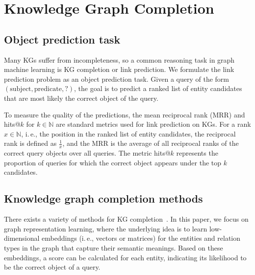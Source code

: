 \documentclass[
]{ceurart}
\begin{document}
\section{Knowledge Graph Completion}
\label{sec:knowledge}

\subsection{Object prediction task}
Many KGs suffer from incompleteness, so a common reasoning task in graph machine learning is KG completion or link prediction. We formulate the link prediction problem as an object prediction task. Given a query of the form $(\mathrm{subject}, \mathrm{predicate}, \mathrm{?})$, the goal is to predict a ranked list of entity candidates that are most likely the correct object of the query. 

To measure the quality of the predictions, the mean reciprocal rank (MRR) and hits@$k$ for $k \in \mathbb{N}$ are standard metrics used for link prediction on KGs. For a rank $x \in \mathbb{N}$, i.\,e., the position in the ranked list of entity candidates, the reciprocal rank is defined as $\frac{1}{x}$, and the MRR is the average of all reciprocal ranks of the correct query objects over all queries.  
The metric hits@$k$ represents the proportion of queries for which the correct object appears under the top $k$ candidates.

\subsection{Knowledge graph completion methods}
There exists a variety of methods for KG completion~\cite{wang2021}. In this paper, we focus on graph representation learning, where the underlying idea is to learn low-dimensional embeddings (i.\,e., vectors or matrices) for the entities and relation types in the graph that capture their semantic meanings. Based on these embeddings, a score can be calculated for each entity, indicating its likelihood to be the correct object of a query.
\end{document}
